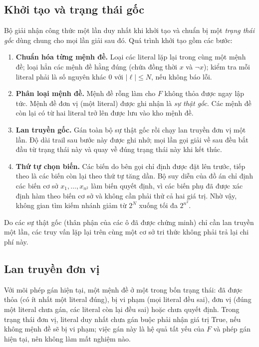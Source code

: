 \subsection{Khởi tạo và trạng thái gốc}
\label{subsec:dpll-khoi-tao}

Bộ giải nhận công thức một lần duy nhất khi khởi tạo và chuẩn bị một \emph{trạng thái gốc} dùng chung cho mọi lần giải sau đó. Quá trình khởi tạo gồm các bước:
\begin{enumerate}
    \item \textbf{Chuẩn hóa từng mệnh đề.} Loại các literal lặp lại trong cùng một mệnh đề; loại hẳn các mệnh đề hằng đúng (chứa đồng thời $x$ và $\neg x$); kiểm tra mỗi literal phải là số nguyên khác 0 với $|\ell| \le N$, nếu không báo lỗi.
    \item \textbf{Phân loại mệnh đề.} Mệnh đề rỗng làm cho $F$ không thỏa được ngay lập tức. Mệnh đề đơn vị (một literal) được ghi nhận là \emph{sự thật gốc}. Các mệnh đề còn lại có từ hai literal trở lên được lưu vào kho mệnh đề.
    \item \textbf{Lan truyền gốc.} Gán toàn bộ sự thật gốc rồi chạy lan truyền đơn vị một lần. Độ dài trail sau bước này được ghi nhớ; mọi lần gọi giải về sau đều bắt đầu từ trạng thái này và quay về đúng trạng thái này khi kết thúc.
    \item \textbf{Thứ tự chọn biến.} Các biến do bên gọi chỉ định được đặt lên trước, tiếp theo là các biến còn lại theo thứ tự tăng dần. Bộ suy diễn của đồ án chỉ định các biến cơ sở $x_1,\dots,x_{n^2}$ làm biến quyết định, vì các biến phụ đã được xác định hàm theo biến cơ sở và không cần phải thử cả hai giá trị. Nhờ vậy, không gian tìm kiếm nhánh giảm từ $2^{N}$ xuống tối đa $2^{n^2}$.
\end{enumerate}

Do các sự thật gốc (thân phận của các ô đã được chứng minh) chỉ cần lan truyền một lần, các truy vấn lặp lại trên cùng một cơ sở tri thức không phải trả lại chi phí này.

\subsection{Lan truyền đơn vị}
\label{subsec:lan-truyen-don-vi}

Với mõi phép gán hiện tại, một mệnh đề ở một trong bốn trạng thái: đã được thỏa (có ít nhất một literal đúng), bị vi phạm (mọi literal đều sai), đơn vị (đúng một literal chưa gán, các literal còn lại đều sai) hoặc chưa quyết định. Trong trạng thái đơn vị, literal duy nhất chưa gán buộc phải nhận giá trị True, nếu không mệnh đề sẽ bị vi phạm; việc gán này là hệ quả tất yếu của $F$ và phép gán hiện tại, nên không làm mất nghiệm nào.


